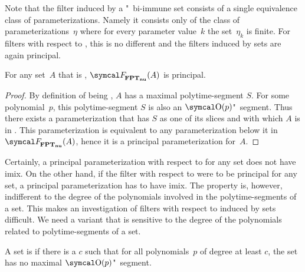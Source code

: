 Note that the filter induced by a "~bi-immune set consists of a single equivalence class of parameterizations.
Namely it consists only of the class of parameterizations~$\eta$ where for every parameter value~$k$ the set~$\eta_k$ is finite.
For filters with respect to , this is no different and the filters induced by  sets are again principal.
\begin{theorem}
\label{thm:nufptprincipal}%
  For any set~$A$ that is , $\calF_\clnu{FPT}(A)$ is principal.
\end{theorem}
\begin{proof}
  By definition of being , $A$ has a maximal polytime-segment $S$.
  For some polynomial~$p$, this polytime-segment $S$ is also an $\bigO(p)$"~segment.
  Thus there exists a parameterization that has $S$ as one of its slices and with which $A$ is in .
  This parameterization is equivalent to any parameterization below it in~$\calF_\clnu{FPT}(A)$, hence it is a principal parameterization for~$A$.
\end{proof}
%

Certainly, a principal parameterization with respect to  for any  set does not have imix.
On the other hand, if the filter with respect to  were to be principal for any  set, a principal parameterization has to have imix.
The  property is, however, indifferent to the degree of the polynomials involved in the polytime-segments of a set.
This makes an investigation of filters with respect to  induced by  sets difficult.
We need a variant that is sensitive to the degree of the polynomials related to polytime-segments of a set.
\begin{definition}
  A set is  if there is a $c$ such that for all polynomials~$p$ of degree at least $c$, the set has no maximal $\bigO(p)$"~segment.
\end{definition}

